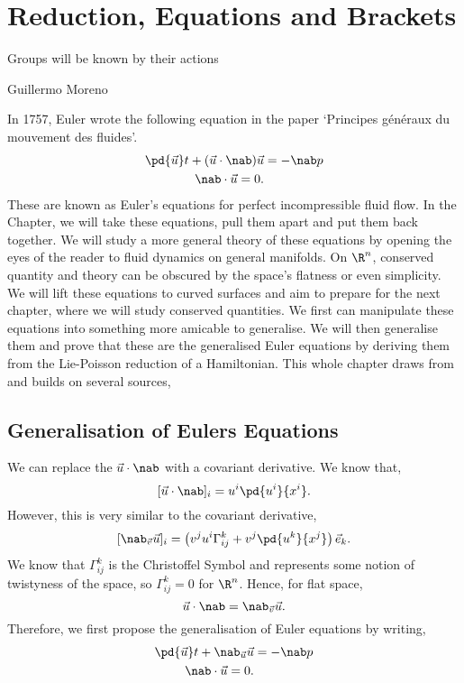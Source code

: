 
\chapter{Reduction, Equations and Brackets}
\epigraph{Groups will be known by their actions}{Guillermo Moreno}

\noindent
In 1757, Euler wrote the following equation in the paper `Principes g\'en\'eraux du mouvement des fluides'.
\begin{align*}
  \pd {\vec u} t + ({\vec u} \cdot\nab){\vec u} &= - \nab p\\
  \nab \cdot {\vec u} = 0.
\end{align*}
These are known as Euler's equations for perfect incompressible fluid flow. In the Chapter, we will take these equations, pull them apart and put them back together. We will study a more general theory of these equations by opening the eyes of the reader to fluid dynamics on general manifolds. On $\R^n$, conserved quantity and theory can be obscured by the space's flatness or even simplicity. We will lift these equations to curved surfaces and aim to prepare for the next chapter, where we will study conserved quantities. We first can manipulate these equations into something more amicable to generalise. We will then generalise them and prove that these are the generalised Euler equations by deriving them from the Lie-Poisson reduction of a Hamiltonian. This whole chapter draws from and builds on several sources,~\cite{tmih,holm,arthur,holm1998eulerpoincare,gary_fluids,gaybalmaz2009geometric,Kolev_2007,diffeost,shkoller2000incompressible,marsden1999geometry,vasylkevych2007liepoisson,}

\section{Generalisation of Eulers Equations}
\noindent
We can replace the $\vec u \cdot \nab$ with a covariant derivative. We know that,
$$ [\vec u \cdot \nab]_i = u^i \pd {u^i} {x^i}. $$
However, this is very similar to the covariant derivative,
$$ [\nab_{\vec v}\vec u]_i = \left(v^ju^i\Gamma_{ij}^k + v^j \pd {u^k}{x^j}\right)\vec e_k. $$
We know that $\Gamma_{ij}^k$ is the Christoffel Symbol and represents some notion of twistyness of the space, so $\Gamma_{ij}^k = 0$ for $\R^n$. Hence, for flat space,
$$ \vec u \cdot \nab = \nab_{\vec v}\vec u. $$
Therefore, we first propose the generalisation of Euler equations by writing,
\begin{equation}
  \begin{split}
    \pd {\vec u} t + \nab_{\vec u}{\vec u} &= - \nab p\\
    \nab \cdot {\vec u} = 0.
  \end{split}
  \label{eq:CVDEulerEqns}
\end{equation}

